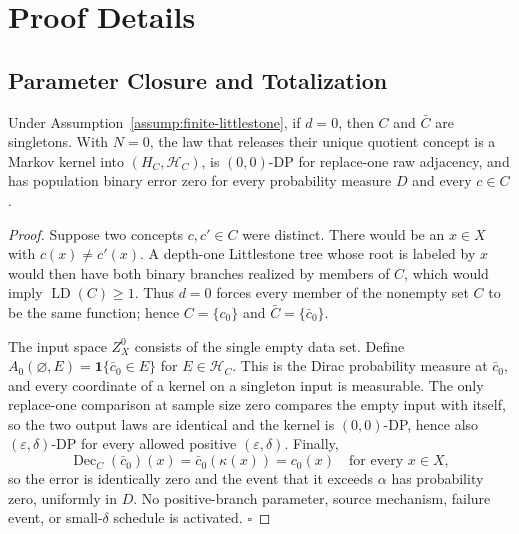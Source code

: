 \appendix

\section{Proof Details}

\subsection{Parameter Closure and Totalization}\label{app:step_001}


\begin{proposition}\label{prop:step-001-zero}
Under Assumption~\ref{assump:finite-littlestone}, if \(d=0\), then \(C\)
and \(\bar C\) are singletons. With \(N=0\), the law that releases their
unique quotient concept is a Markov kernel into \((H_C,\mathcal H_C)\), is
\((0,0)\)-DP for replace-one raw adjacency, and has population binary error
zero for every probability measure \(D\) and every \(c\in C\).


\end{proposition}

\begin{proof}
Suppose two concepts \(c,c'\in C\) were distinct. There would be
an \(x\in X\) with \(c(x)\ne c'(x)\). A depth-one Littlestone tree whose
root is labeled by \(x\) would then have both binary branches realized by
members of \(C\), which would imply \(\operatorname{LD}(C)\ge1\). Thus
\(d=0\) forces every member of the nonempty set \(C\) to be the same
function; hence \(C=\{c_0\}\) and \(\bar C=\{\bar c_0\}\).

The input space \(Z_X^0\) consists of the single empty data set. Define
\(A_0(\varnothing,E)=\mathbf1\{\bar c_0\in E\}\) for
\(E\in\mathcal H_C\). This is the Dirac probability measure at
\(\bar c_0\), and every coordinate of a kernel on a singleton input is
measurable. The only replace-one comparison at sample size zero compares the
empty input with itself, so the two output laws are identical and the kernel
is \((0,0)\)-DP, hence also \((\varepsilon,\delta)\)-DP for every allowed
positive \((\varepsilon,\delta)\). Finally,
\[
\operatorname{Dec}_C(\bar c_0)(x)
=\bar c_0(\kappa(x))=c_0(x)
\quad\text{for every }x\in X,
\]
so the error is identically zero and the event that it exceeds \(\alpha\)
has probability zero, uniformly in \(D\). No positive-branch parameter,
source mechanism, failure event, or small-\(\delta\) schedule is activated.
\(\square\)


\end{proof}

